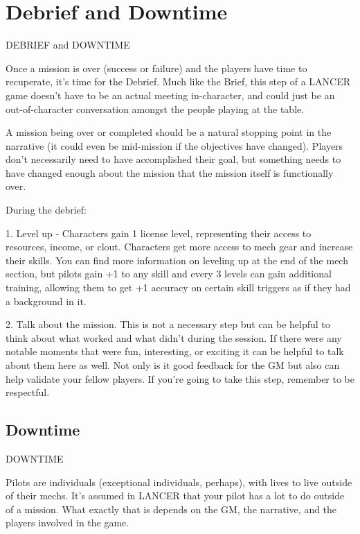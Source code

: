 \section{Debrief and Downtime}

                      DEBRIEF and DOWNTIME
 

Once a mission is over (success or failure) and the players have time to recuperate, it’s time for  
the Debrief. Much like the Brief, this step of a LANCER game doesn’t have to be an actual  
meeting in-character, and could just be an out-of-character conversation amongst the people  
playing at the table. 
 

A mission being over or completed should be a natural stopping point in the narrative (it could  
even be mid-mission if the objectives have changed). Players don’t necessarily need to have  
accomplished their goal, but something needs to have changed enough about the mission that  
the mission itself is functionally over.
 

During the debrief:
 
	        1. Level up - Characters gain 1 license level, representing their access to resources,  
income, or clout. Characters get more access to mech gear and increase their skills. You can find  
more information on leveling up at the end of the mech section, but pilots gain +1 to any skill and  
every 3 levels can gain additional training, allowing them to get +1 accuracy on certain skill  
triggers as if they had a background in it.
 
	        2. Talk about the mission. This is not a necessary step but can be helpful to think about  
what worked and what didn’t during the session. If there were any notable moments that were  
fun, interesting, or exciting it can be helpful to talk about them here as well. Not only is it good  
feedback for the GM but also can help validate your fellow players. If you’re going to take this  
step, remember to be respectful.
 

\subsection{Downtime}
                                             DOWNTIME
 

Pilots are individuals (exceptional individuals, perhaps), with lives to live outside of their mechs.  
It’s assumed in LANCER that your pilot has a lot to do outside of a mission. What exactly that is  
depends on the GM, the narrative, and the players involved in the game. 
 

